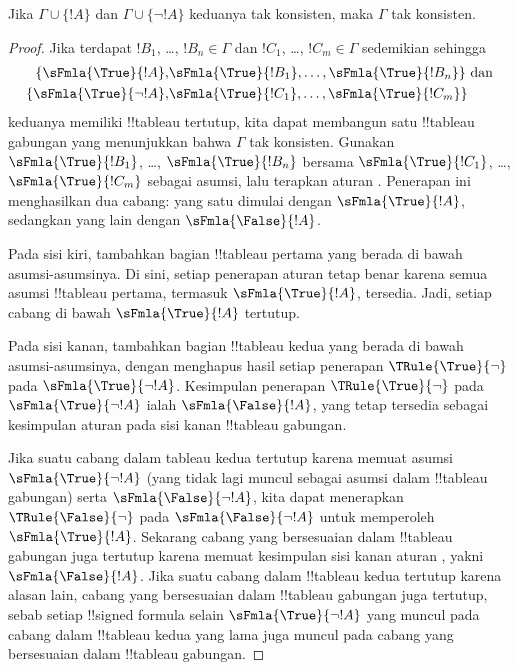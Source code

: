 \documentclass[../../../include/open-logic-section]{subfiles}
\begin{document}
\begin{prop}
  Jika $\Gamma \cup \{!A\}$ dan $\Gamma \cup \{\lnot !A\}$ keduanya
  tak konsisten, maka $\Gamma$ tak konsisten.
\end{prop}

\begin{proof}
  Jika terdapat $!B_1$, \dots, $!B_n \in \Gamma$ dan $!C_1$, \dots,
  $!C_m \in \Gamma$ sedemikian sehingga
  \begin{align*}
    \{\sFmla{\True}{!A}, &
    \sFmla{\True}{!B_1}, \dots, \sFmla{\True}{!B_n}\} \text{ dan}\\
    \{\sFmla{\True}{\lnot !A}, &
    \sFmla{\True}{!C_1}, \dots, \sFmla{\True}{!C_m}\}
  \end{align*}
  keduanya memiliki !!{tableau} tertutup, kita dapat membangun satu
  !!{tableau} gabungan yang menunjukkan bahwa $\Gamma$ tak konsisten.
  Gunakan $\sFmla{\True}{!B_1}$, \dots, $\sFmla{\True}{!B_n}$ bersama
  $\sFmla{\True}{!C_1}$, \dots, $\sFmla{\True}{!C_m}$ sebagai asumsi,
  lalu terapkan aturan \Cut{}. Penerapan ini menghasilkan dua cabang:
  yang satu dimulai dengan $\sFmla{\True}{!A}$, sedangkan yang lain
  dengan $\sFmla{\False}{!A}$.

  Pada sisi kiri, tambahkan bagian !!{tableau} pertama yang berada di
  bawah asumsi-asumsinya. Di sini, setiap penerapan aturan tetap benar
  karena semua asumsi !!{tableau} pertama, termasuk
  $\sFmla{\True}{!A}$, tersedia. Jadi, setiap cabang di bawah
  $\sFmla{\True}{!A}$ tertutup.

  Pada sisi kanan, tambahkan bagian !!{tableau} kedua yang berada di
  bawah asumsi-asumsinya, dengan menghapus hasil setiap penerapan
  $\TRule{\True}{\lnot}$ pada $\sFmla{\True}{\lnot !A}$. Kesimpulan
  penerapan $\TRule{\True}{\lnot}$ pada $\sFmla{\True}{\lnot !A}$ ialah
  $\sFmla{\False}{!A}$, yang tetap tersedia sebagai kesimpulan aturan
  \Cut{} pada sisi kanan !!{tableau} gabungan.

  Jika suatu cabang dalam tableau kedua tertutup karena memuat asumsi
  $\sFmla{\True}{\lnot !A}$ (yang tidak lagi muncul sebagai asumsi dalam
  !!{tableau} gabungan) serta $\sFmla{\False}{\lnot !A}$, kita dapat
  menerapkan $\TRule{\False}{\lnot}$ pada
  $\sFmla{\False}{\lnot !A}$ untuk memperoleh $\sFmla{\True}{!A}$.
  Sekarang cabang yang bersesuaian dalam !!{tableau} gabungan juga
  tertutup karena memuat kesimpulan sisi kanan aturan \Cut{}, yakni
  $\sFmla{\False}{!A}$. Jika suatu cabang dalam !!{tableau} kedua
  tertutup karena alasan lain, cabang yang bersesuaian dalam !!{tableau}
  gabungan juga tertutup, sebab setiap !!{signed formula} selain
  $\sFmla{\True}{\lnot !A}$ yang muncul pada cabang dalam !!{tableau}
  kedua yang lama juga muncul pada cabang yang bersesuaian dalam
  !!{tableau} gabungan.
\end{proof}
\end{document}
